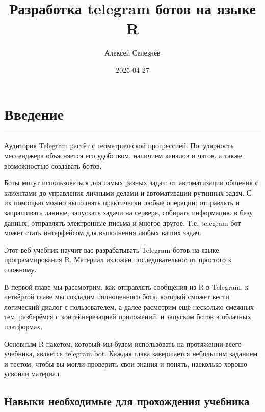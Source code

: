 \documentclass[
]{book}
\title{Разработка telegram ботов на языке R}
\author{Алексей Селезнёв}
\date{2025-04-27}
\begin{document}
\maketitle

{
\setcounter{tocdepth}{1}
\tableofcontents
}
\chapter*{Введение}\label{ux432ux432ux435ux434ux435ux43dux438ux435}

\begin{center}\rule{0.5\linewidth}{0.5pt}\end{center}

Аудитория Telegram растёт с геометрической прогрессией. Популярность мессенджера объясняется его удобством, наличием каналов и чатов, а также возможностью создавать ботов.

Боты могут использоваться для самых разных задач: от автоматизации общения с клиентами до управления личными делами и автоматизации рутинных задач. С их помощью можно выполнять практически любые операции: отправлять и запрашивать данные, запускать задачи на сервере, собирать информацию в базу данных, отправлять электронные письма и многое другое. Т.е. telegram бот может стать интерфейсом для выполнения любых ваших задач.

Этот веб-учебник научит вас разрабатывать Telegram-ботов на языке программирования R. Материал изложен последовательно: от простого к сложному.

В первой главе мы рассмотрим, как отправлять сообщения из R в Telegram, к четвёртой главе мы создадим полноценного бота, который сможет вести логический диалог с пользователем, а далее расмотрим ещё несколько смежных тем, разберёмся с контейнерезацией приложений, и запуском ботов в облачных платформах.

Основным R-пакетом, который мы будем использовать на протяжении всего учебника, является telegram.bot. Каждая глава завершается небольшим заданием и тестом, чтобы вы могли проверить свои знания и понять, насколько хорошо усвоили материал.

\section*{Навыки необходимые для прохождения учебника}\label{ux43dux430ux432ux44bux43aux438-ux43dux435ux43eux431ux445ux43eux434ux438ux43cux44bux435-ux434ux43bux44f-ux43fux440ux43eux445ux43eux436ux434ux435ux43dux438ux44f-ux443ux447ux435ux431ux43dux438ux43aux430}
\end{document}
